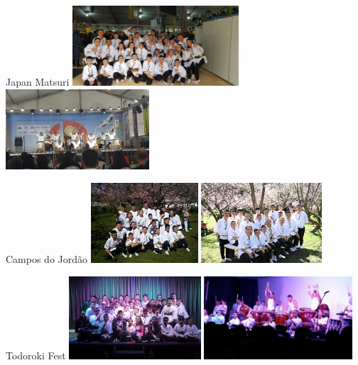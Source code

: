 \documentclass{beamer}
\begin{document}
\begin{frame}{Japan Matsuri}
    \includegraphics[height=3cm]{JM-1}
    \includegraphics[height=3cm]{JM-2}
\end{frame}

\begin{frame}{Campos do Jordão}
    \includegraphics[height=3cm]{campos-1}
    \includegraphics[height=3cm]{campos-2}
\end{frame}

\begin{frame}{Todoroki Fest}
    \includegraphics[height=3.1cm]{todoroki-fest-1}
    \includegraphics[height=3.1cm]{todoroki-fest-2}
\end{frame}
\end{document}
